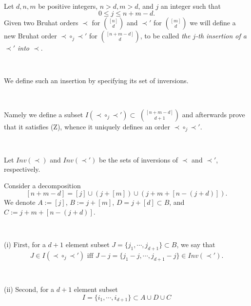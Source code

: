 \documentclass[12pt,a4paper]{article}
\makeatletter
\renewcommand{\subsubsection}{\@startsection{subsubsection}{2}{0pt}%
{-2.0ex plus -1ex minus -.2ex}{-2.0ex plus .2ex}%
{\normalfont\normalsize\underline}}
\makeatother
\begin{document}
 \
 
 Let $d, n, m$ be positive integers, $n > d, m > d$, and $j$ an integer such that 
 $$
 0\leq j\leq n+m-d.
 $$ 
 Given two Bruhat orders $\prec$ for ${[n]}\choose {d}$ and $\prec'$ for ${[m]}\choose {d}$ we will define a new Bruhat order $\prec\circ_j\prec'$ for ${[n+m-d]}\choose {d}$, to be called 
 {\em the $j$-th insertion of a 
   $\prec'$  into  $\prec$}. 
 
 
\ 

We define such an insertion by specifying  its  set of inversions.
 
 \
 
  Namely we define a subset $I(\prec\circ_j\prec')\subset$ ${[n+m-d]}\choose {d+1}$ and afterwards prove that it satisfies (Z), whence it uniquely defines an order $\prec\circ_j\prec'$. 
 
 \
 
  Let $Inv(\prec)$ and $Inv(\prec')$ be the sets of inversions of $\prec$ and $\prec'$, respectively.
 
 
 Consider a decomposition 
 \[
 [n+m-d]=[ j]\cup ( j+[m]) \cup (j+m+[n-(j+d)]).
 \]
 We denote $A:=[j]$, $B:=j+[m]$, $D = j + [d]\subset B$, and $C:=j+m+[n-(j+d)]$.
 
 \
 
 
 
(i) First,   for a $d+1$ element subset  $J=\{j_1, \cdots, j_{d+1}\}\subset B$, we say that 
\begin{equation}\label{inv1}
J\in I (\prec\circ_j\prec' )\mbox{ iff  }
  J-j=\{j_1-j, \cdots, j_{d+1}-j\}\in Inv(\prec').
  \end{equation}
  
  
  \

(ii) Second,  for a  $d+1$ element  subset 
\[
I=\{i_1, \cdots, i_{d+1}\}\subset A\cup D\cup  C
\]
\end{document}
